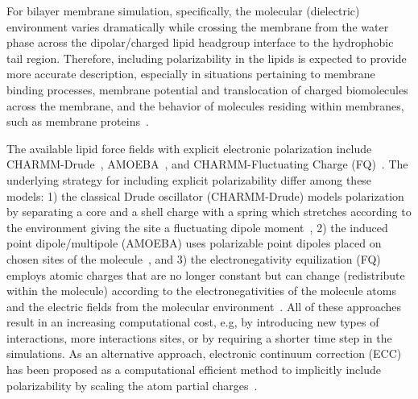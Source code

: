 \documentclass[journal=jacsat,manuscript=article,layout=singlecolumn]{achemso}
\begin{document}
For bilayer membrane simulation, specifically,  the molecular (dielectric) environment varies dramatically while crossing the membrane from the water phase across the dipolar/charged lipid headgroup interface to the hydrophobic tail region. Therefore, including polarizability in the lipids is expected to provide more accurate description, especially in situations pertaining to membrane binding processes, membrane potential and translocation of charged biomolecules across the membrane, and the behavior of molecules residing within membranes, such as membrane proteins~\cite{baker2015polarizable,Lemkul2016, li2017drude,chu2018anionicpolarizable,Lynch21,Chen2021,Melcr:2018a, melcr2019improved,nencini22}. 


The available lipid force fields with explicit electronic polarization include CHARMM-Drude~\cite{li2017drude, yu2023drude}, AMOEBA~\cite{chu2018anionicpolarizable,chu2018polarizable}, and CHARMM-Fluctuating Charge (FQ)~\cite{lucas2012charge}. The underlying strategy for including explicit polarizability differ among these models:  1) the classical Drude oscillator (CHARMM-Drude) models polarization by separating a core and a shell charge with a spring which stretches according to the environment giving the site a fluctuating dipole moment~\cite{Lemkul2016},
2) the induced point dipole/multipole (AMOEBA) uses polarizable point dipoles placed on chosen sites of the molecule~\cite{ponder2010current},
and 3) the electronegativity equilization (FQ) employs atomic charges that are no longer constant but can change (redistribute within the molecule) according to the electronegativities of the molecule atoms and the electric fields from the molecular environment~\cite{patel2004charmm}. All of these approaches result in an increasing computational cost, e.g, by introducing new types of interactions, more interactions sites, or by requiring a shorter time step in the simulations. As an alternative approach, electronic continuum correction (ECC) has been proposed as a computational efficient method to implicitly include polarizability by scaling the atom partial charges~\cite{Melcr:2018a,dijon20}.



\end{document}

